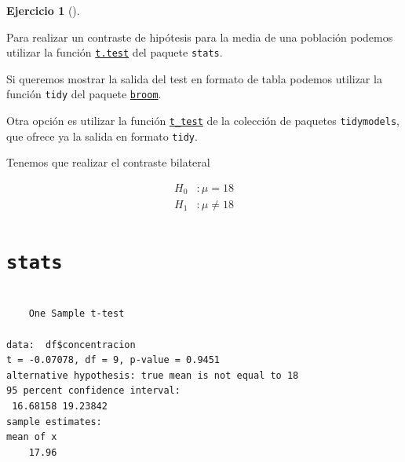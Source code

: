 \documentclass[
  a4paper,
]{scrreport}
\newenvironment{Shaded}{\begin{snugshade}}{\end{snugshade}}
\newcommand{\AttributeTok}[1]{\textcolor[rgb]{0.40,0.45,0.13}{#1}}
\newcommand{\DecValTok}[1]{\textcolor[rgb]{0.68,0.00,0.00}{#1}}
\newcommand{\FunctionTok}[1]{\textcolor[rgb]{0.28,0.35,0.67}{#1}}
\newcommand{\NormalTok}[1]{\textcolor[rgb]{0.00,0.23,0.31}{#1}}
\newcommand{\SpecialCharTok}[1]{\textcolor[rgb]{0.37,0.37,0.37}{#1}}
\theoremstyle{definition}
\newtheorem{exercise}{Ejercicio}[chapter]
\theoremstyle{remark}
\begin{document}
\begin{exercise}[]
\begin{enumerate}
\begin{tcolorbox}
  Para realizar un contraste de hipótesis para la media de una población
  podemos utilizar la función
  \href{https://www.rdocumentation.org/packages/stats/versions/3.6.2/topics/t.test}{\texttt{t.test}}
  del paquete \texttt{stats}.

  Si queremos mostrar la salida del test en formato de tabla podemos
  utilizar la función \texttt{tidy} del paquete
  \href{https://broom.tidymodels.org/index.html}{\texttt{broom}}.

  Otra opción es utilizar la función
  \href{https://infer.tidymodels.org/reference/t_test.html}{\texttt{t\_test}}
  de la colección de paquetes \texttt{tidymodels}, que ofrece ya la
  salida en formato \texttt{tidy}.

  \end{tcolorbox}

  \begin{tcolorbox}[enhanced jigsaw, colframe=quarto-callout-tip-color-frame, toprule=.15mm, bottomtitle=1mm, breakable, opacitybacktitle=0.6, toptitle=1mm, colback=white, bottomrule=.15mm, title=\textcolor{quarto-callout-tip-color}{\faLightbulb}\hspace{0.5em}{Solución}, arc=.35mm, left=2mm, titlerule=0mm, rightrule=.15mm, coltitle=black, leftrule=.75mm, opacityback=0, colbacktitle=quarto-callout-tip-color!10!white]

  Tenemos que realizar el contraste bilateral

  \begin{align*}
  H_0 &: \mu=18\\
  H_1 &: \mu\neq 18 
  \end{align*}

  \section{\texorpdfstring{\texttt{stats}}{stats}}

\begin{Shaded}
\end{Shaded}

\begin{verbatim}

    One Sample t-test

data:  df$concentracion
t = -0.07078, df = 9, p-value = 0.9451
alternative hypothesis: true mean is not equal to 18
95 percent confidence interval:
 16.68158 19.23842
sample estimates:
mean of x 
    17.96 
\end{verbatim}


\end{tcolorbox}
\end{enumerate}
\end{exercise}
\end{document}
